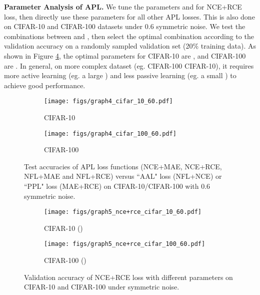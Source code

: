 \documentclass{article}
\begin{document}
\textbf{Parameter Analysis of APL.} We tune the parameters  and  for NCE+RCE loss, then directly use these parameters for all other APL losses. This is also done on CIFAR-10 and CIFAR-100 datasets under 0.6 symmetric noise. 
We test the combinations between  and , then select the optimal combination according to the validation accuracy on a randomly sampled validation set (20\% training data). As shown in Figure \ref{fig:5}, the optimal parameters for CIFAR-10 are , and CIFAR-100 are . In general, on more complex dataset (eg. CIFAR-100  CIFAR-10), it requires more active learning (eg. a large ) and less passive learning (eg. a small ) to achieve good performance.


\begin{figure}[!t]
	\centering
	\begin{subfigure}{0.48\linewidth}
		\texttt{[image: figs/graph4\_cifar\_10\_60.pdf]}
		\caption{CIFAR-10}
		\label{ce_nce_combo}
	\end{subfigure}
	\begin{subfigure}{0.48\linewidth} 
		\texttt{[image: figs/graph4\_cifar\_100\_60.pdf]}
		\caption{CIFAR-100}
		\label{fl_nfl_combo}
	\end{subfigure}
	\vspace{-0.1 in}
	\caption{Test accuracies of APL loss functions (NCE+MAE, NCE+RCE, NFL+MAE and NFL+RCE) versus ``AAL" loss (NFL+NCE) or ``PPL" loss (MAE+RCE) on CIFAR-10/CIFAR-100 with 0.6 symmetric noise.}
	\label{fig:4}
\end{figure}

\begin{figure}[!t]
	\centering
	\begin{subfigure}{0.48\linewidth}
		\texttt{[image: figs/graph5\_nce+rce\_cifar\_10\_60.pdf]}
		\caption{CIFAR-10 ()}
	\end{subfigure}
	\begin{subfigure}{0.48\linewidth}
		\texttt{[image: figs/graph5\_nce+rce\_cifar\_100\_60.pdf]}
		\caption{CIFAR-100 ()}
	\end{subfigure}
	\vspace{-0.1 in}
	\caption{Validation accuracy of NCE+RCE loss with different parameters on CIFAR-10 and CIFAR-100 under symmetric noise.}
 	\vspace{-0.15 in}
	\label{fig:5}
\end{figure}
\end{document}
